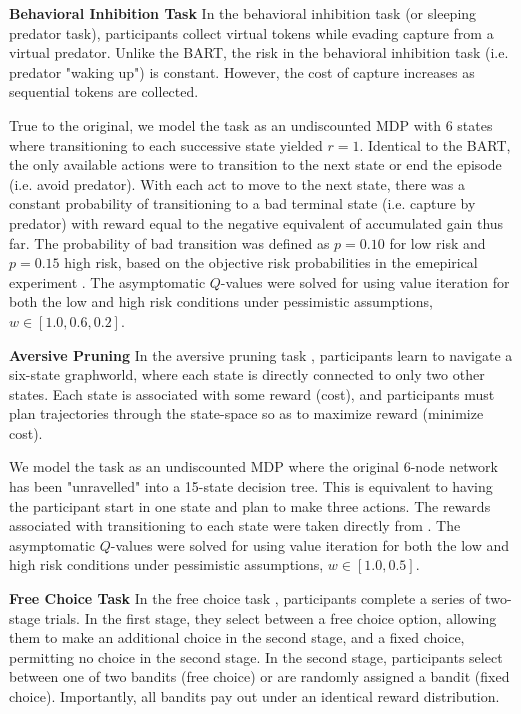 \documentclass[11pt]{article} %
\begin{document}
\textbf{Behavioral Inhibition Task} In the behavioral inhibition task \citep{bach2015} (or sleeping predator task), participants collect virtual tokens while evading capture from a virtual predator. Unlike the BART, the risk in the behavioral inhibition task (i.e. predator "waking up") is constant. However, the cost of capture increases as sequential tokens are collected.

True to the original, we model the task as an undiscounted MDP with 6 states where transitioning to each successive state yielded $r=1$. Identical to the BART, the only available actions were to transition to the next state or end the episode (i.e. avoid predator). With each act to move to the next state, there was a constant probability of transitioning to a bad terminal state (i.e. capture by predator) with reward equal to the negative equivalent of accumulated gain thus far. The probability of bad transition was defined as $p = 0.10$ for low risk and $p = 0.15$ high risk, based on the objective risk probabilities in the emepirical experiment \citep{bach2015}. The asymptomatic $Q$-values were solved for using value iteration for both the low and high risk conditions under pessimistic assumptions, $w \in [1.0, 0.6, 0.2]$.

\textbf{Aversive Pruning} In the aversive pruning task \citep{Huys2012, Lally2017}, participants learn to navigate a six-state graphworld, where each state is directly connected to only two other states. Each state is associated with some reward (cost), and participants must plan trajectories through the state-space so as to maximize reward (minimize cost). 

We model the task as an undiscounted MDP where the original 6-node network has been "unravelled" into a 15-state decision tree. This is equivalent to having the participant start in one state and plan to make three actions. The rewards associated with transitioning to each state were taken directly from \citep{Huys2012, Lally2017}. The asymptomatic $Q$-values were solved for using value iteration for both the low and high risk conditions under pessimistic assumptions, $w \in [1.0, 0.5]$.

\textbf{Free Choice Task} In the free choice task \citep{Leotti2011}, participants complete a series of two-stage trials. In the first stage, they select between a free choice option, allowing them to make an additional choice in the second stage, and a fixed choice, permitting no choice in the second stage. In the second stage, participants select between one of two bandits (free choice) or are randomly assigned a bandit (fixed choice). Importantly, all bandits pay out under an identical reward distribution. 
\end{document}
